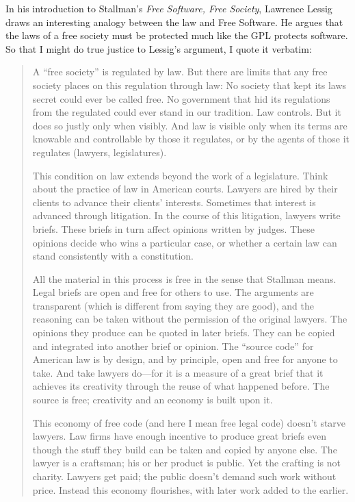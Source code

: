 In his introduction to Stallman's \emph{Free Software, Free Society},
Lawrence Lessig draws an interesting analogy between the law and Free
Software. He argues that the laws of a free society must be protected
much like the GPL protects software.  So that I might do true justice to
Lessig's argument, I quote it verbatim:

\begin{quotation}

A ``free society'' is regulated by law. But there are limits that any free
society places on this regulation through law: No society that kept its
laws secret could ever be called free.  No government that hid its
regulations from the regulated could ever stand in our tradition. Law
controls.  But it does so justly only when visibly.  And law is visible
only when its terms are knowable and controllable by those it regulates,
or by the agents of those it regulates (lawyers, legislatures).

This condition on law extends beyond the work of a legislature.  Think
about the practice of law in American courts.  Lawyers are hired by their
clients to advance their clients' interests.  Sometimes that interest is
advanced through litigation. In the course of this litigation, lawyers
write briefs. These briefs in turn affect opinions written by judges.
These opinions decide who wins a particular case, or whether a certain law
can stand consistently with a constitution.

All the material in this process is free in the sense that Stallman means.
Legal briefs are open and free for others to use.  The arguments are
transparent (which is different from saying they are good), and the
reasoning can be taken without the permission of the original lawyers.
The opinions they produce can be quoted in later briefs.  They can be
copied and integrated into another brief or opinion.  The ``source code''
for American law is by design, and by principle, open and free for anyone
to take. And take lawyers do---for it is a measure of a great brief that
it achieves its creativity through the reuse of what happened before.  The
source is free; creativity and an economy is built upon it.

This economy of free code (and here I mean free legal code) doesn't starve
lawyers.  Law firms have enough incentive to produce great briefs even
though the stuff they build can be taken and copied by anyone else.  The
lawyer is a craftsman; his or her product is public.  Yet the crafting is
not charity. Lawyers get paid; the public doesn't demand such work
without price.  Instead this economy flourishes, with later work added to
the earlier.


\end{quotation}
